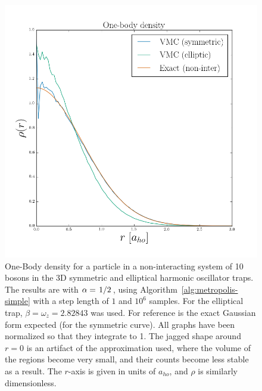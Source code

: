 \documentclass[a4paper, 11pt]{article}
\begin{document}
\begin{figure}[!h]
    \centering
    \includegraphics[width=0.8\linewidth]{../results/one-body-3D-N10-noniter.png}
    \caption{One-Body density for a particle in a non-interacting system of 10
    bosons in the 3D symmetric and elliptical harmonic oscillator traps. The results are with
    $\alpha=\flatfrac{1}{2}$, using Algorithm~\ref{alg:metropolis-simple} with a
    step length of $1$ and $10^6$ samples. For the elliptical trap,
    $\beta=\omega_z=2.82843$ was used. For reference is the exact Gaussian
    form expected (for the symmetric curve). All graphs have been normalized so that they integrate to 1.
    The jagged shape around $r=0$ is an artifact of the approximation used,
    where the volume of the regions become very small, and their counts become
    less stable as a result. The $r$-axis is given in units of $a_{ho}$, and $\rho$ is
    similarly dimensionless.}
    \label{fig:density-ideal}
\end{figure}
\end{document}
